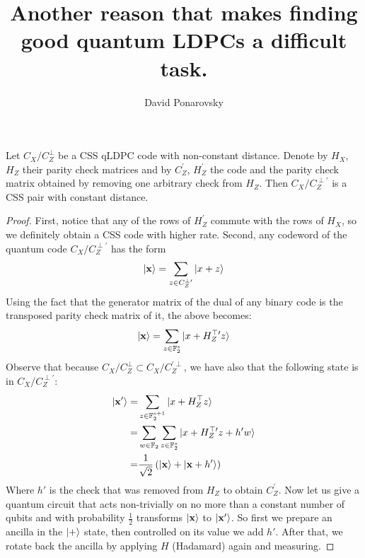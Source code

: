 \documentclass[manuscript,screen,review]{acmart}
\begin{document}


\title{Another reason that makes finding good quantum LDPCs a difficult task.} 
\author{David Ponarovsky}
  \maketitle
  
  \begin{claim}
Let $C_X/C_Z^{\perp}$ be a CSS qLDPC code with non-constant distance. Denote by $H_X$, $H_Z$ their parity check matrices and by $C_Z^{\prime}$, $H_Z^{\prime}$ the code and the parity check matrix obtained by removing one arbitrary check from $H_Z$. Then $C_X/C_Z^{\perp \prime}$ is a CSS pair with constant distance.
\end{claim}

\begin{proof}
First, notice that any of the rows of $H_Z^{\prime}$ commute with the rows of $H_X$, so we definitely obtain a CSS code with higher rate. Second, any codeword of the quantum code $C_X/C_Z^{\perp \prime}$ has the form  
\begin{equation*}
  \begin{split}
    \ket{\mathbf{x}} = \sum_{z \in C_Z^{\perp \prime}}{\ket{x + z}}
  \end{split}
\end{equation*}
Using the fact that the generator matrix of the dual of any binary code is the transposed parity check matrix of it, the above becomes:
\begin{equation*}
  \begin{split}
    \ket{\mathbf{x}} = \sum_{z \in \mathbb{F}_2^s}{\ket{x + H_Z^{\top \prime}z}}
  \end{split}
\end{equation*}
Observe that because $C_X/C_Z^{\perp} \subset C_X/C_Z^{\prime \perp}$, we have also that the following state is in $C_X/C_Z^{\perp \prime}$:
\begin{equation*}
  \begin{split} 
    \ket{\mathbf{x'}} = & \sum_{z \in \mathbb{F}_2^{s+1}}{\ket{x + H_Z^{\top}z}} \\
    =& \sum_{w \in \mathbb{F}_2}\sum_{z \in \mathbb{F}_2^s}{\ket{x + H_Z^{\top \prime}z + h'w  }} \\ 
    =& \frac{1}{\sqrt{2}}\left( \ket{\mathbf{x}} + \ket{\mathbf{x} + h^{\prime}} \right)
  \end{split}
\end{equation*}
Where $h'$ is the check that was removed from $H_Z$ to obtain $C_Z^{\prime}$. Now let us give a quantum circuit that acts non-trivially on no more than a constant number of qubits and with probability $\frac{1}{2}$ transforms $\ket{\mathbf{x}}$ to $\ket{\mathbf{x'}}$. So first we prepare an ancilla in the $\ket{+}$ state, then controlled on its value we add $h'$. After that, we rotate back the ancilla by applying $H$ (Hadamard) again and measuring.


\end{proof}
\end{document}
